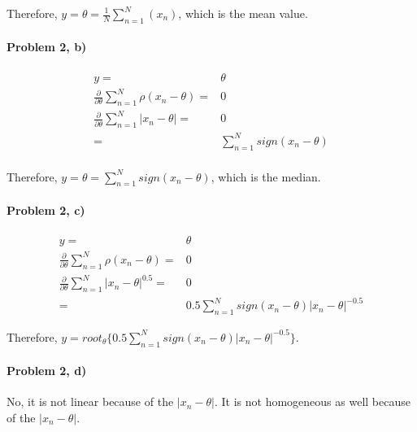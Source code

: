 \documentclass[11pt]{article}
\begin{document}
\begin{flushleft}
    Therefore, $y = \theta =  \frac{1}{N} \sum_{n = 1}^{N} (x_n) $, which is the mean value.
\end{flushleft}  

\paragraph{\noindent\textbf{\LARGE{Problem 2, b)}}}  
  
\begin{equation*}
\begin{split}
    y = & \theta \\ 
    \frac{\partial }{\partial \theta} \sum_{n = 1}^{N} \rho(x_n - \theta) = & 0 \\
    \frac{\partial }{\partial \theta} \sum_{n = 1}^{N} |x_n - \theta| = & 0 \\
        = & \sum_{n = 1}^{N} sign(x_n - \theta) \\
\end{split}
\end{equation*}
    
\begin{flushleft}
    Therefore, $y = \theta =  \sum_{n = 1}^{N} sign(x_n - \theta) $, which is the median.
\end{flushleft}  

\paragraph{\noindent\textbf{\LARGE{Problem 2, c)}}}  
  
\begin{equation*}
\begin{split}
    y = & \theta \\ 
    \frac{\partial }{\partial \theta} \sum_{n = 1}^{N} \rho(x_n - \theta) = & 0 \\
    \frac{\partial }{\partial \theta} \sum_{n = 1}^{N} |x_n - \theta|^{0.5} = & 0 \\
        = & 0.5 \sum_{n = 1}^{N} sign(x_n - \theta) |x_n - \theta| ^{-0.5}
\end{split}
\end{equation*}
    
\begin{flushleft}
    Therefore, $y = root_\theta\{0.5 \sum_{n = 1}^{N} sign(x_n - \theta) |x_n - \theta| ^{-0.5}\}$.
\end{flushleft} 

\paragraph{\noindent\textbf{\LARGE{Problem 2, d)}}}  
  
\begin{flushleft}
    No, it is not linear because of the $|x_n - \theta|$.
    It is not homogeneous as well because of the $|x_n - \theta|$.

\end{flushleft}
\end{document}
